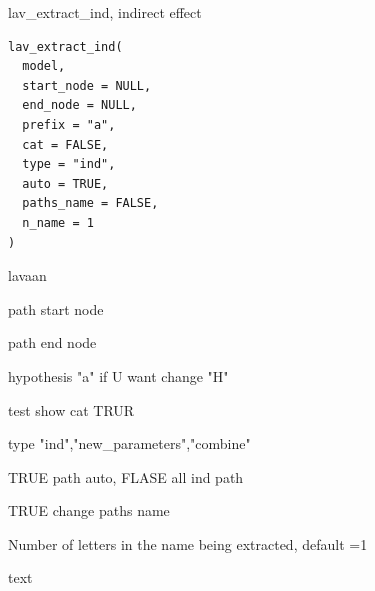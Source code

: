 \documentclass[a4paper]{book}
\begin{document}
%
\begin{Description}
lav\_extract\_ind, indirect effect
\end{Description}
%
\begin{Usage}
\begin{verbatim}
lav_extract_ind(
  model,
  start_node = NULL,
  end_node = NULL,
  prefix = "a",
  cat = FALSE,
  type = "ind",
  auto = TRUE,
  paths_name = FALSE,
  n_name = 1
)
\end{verbatim}
\end{Usage}
%
\begin{Arguments}
\begin{ldescription}
\item[\code{model}] lavaan

\item[\code{start\_node}] path start node

\item[\code{end\_node}] path end node

\item[\code{prefix}] hypothesis "a" if U want change "H"

\item[\code{cat}] test show cat TRUR

\item[\code{type}] type "ind","new\_parameters","combine"

\item[\code{auto}] TRUE path auto, FLASE all ind path

\item[\code{paths\_name}] TRUE change paths name

\item[\code{n\_name}] Number of letters in the name being extracted, default =1
\end{ldescription}
\end{Arguments}
%
\begin{Value}
text
\end{Value}
%
\end{document}
